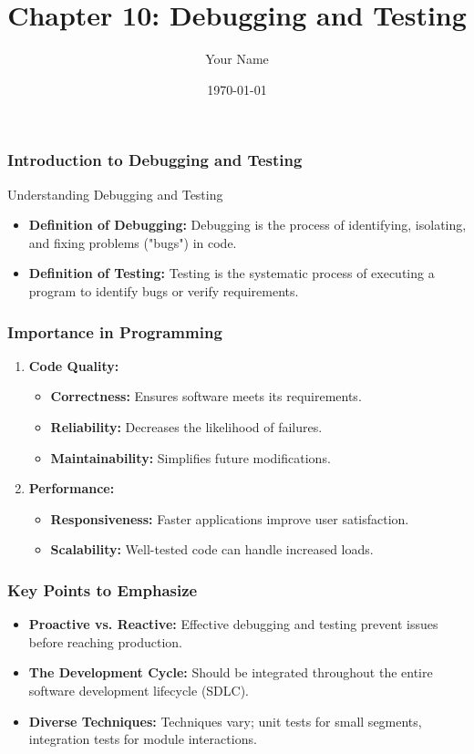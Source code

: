 \documentclass{beamer}
\title{Chapter 10: Debugging and Testing}
\author{Your Name}
\institute{Your Institution}
\date{\today}
\begin{document}
\frame{\titlepage}

\begin{frame}[fragile]
    \frametitle{Introduction to Debugging and Testing}
    \begin{block}{Understanding Debugging and Testing}
        \begin{itemize}
            \item \textbf{Definition of Debugging:} 
                Debugging is the process of identifying, isolating, and fixing problems ("bugs") in code.
            \item \textbf{Definition of Testing:} 
                Testing is the systematic process of executing a program to identify bugs or verify requirements.
        \end{itemize}
    \end{block}
\end{frame}

\begin{frame}[fragile]
    \frametitle{Importance in Programming}
    \begin{enumerate}
        \item \textbf{Code Quality:}
        \begin{itemize}
            \item \textbf{Correctness:} Ensures software meets its requirements.
            \item \textbf{Reliability:} Decreases the likelihood of failures.
            \item \textbf{Maintainability:} Simplifies future modifications.
        \end{itemize}
        
        \item \textbf{Performance:}
        \begin{itemize}
            \item \textbf{Responsiveness:} Faster applications improve user satisfaction.
            \item \textbf{Scalability:} Well-tested code can handle increased loads.
        \end{itemize}
    \end{enumerate}
\end{frame}

\begin{frame}[fragile]
    \frametitle{Key Points to Emphasize}
    \begin{itemize}
        \item \textbf{Proactive vs. Reactive:} 
            Effective debugging and testing prevent issues before reaching production.
        \item \textbf{The Development Cycle:} 
            Should be integrated throughout the entire software development lifecycle (SDLC).
        \item \textbf{Diverse Techniques:} 
            Techniques vary; unit tests for small segments, integration tests for module interactions.
    \end{itemize}
\end{frame}
\end{document}
